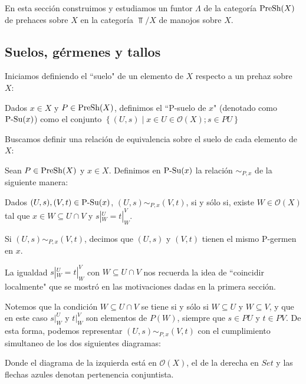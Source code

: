 En esta sección construimos y estudiamos un funtor $\Lambda$ de la categoría $\normalfont{\text{PreSh}}(X)$ de prehaces sobre $X$ en la categoría $\Top /X$ de manojos sobre $X$.

\subsection{Suelos, gérmenes y tallos}

Iniciamos definiendo el ``suelo" de un elemento de $X$ respecto a un prehaz sobre $X$:
\begin{Def}[$P$-suelo de $x$]
   Dados $x\in X$ y $P\in \normalfont{\text{PreSh}}(X)$, definimos el ``P-suelo de $x$" (denotado como $\normalfont{\text{P-Su}} (x)$) como el conjunto $\left\lbrace (U,s)\mid x\in U\in \mathcal{O}(X); s\in PU\right\rbrace$
\end{Def}
 Buscamos definir una relación de equivalencia sobre el suelo de cada elemento de $X$:
\begin{Def}
   Sean $P\in \normalfont{\text{PreSh}}(X)$ y $x\in X$. Definimos en $\normalfont{\text{P-Su}}(x)$ la relación $\sim_{P,x}$ de la siguiente manera:
   \begin{center}
      Dados $(U,s),(V,t)\in \normalfont{\text{P-Su}}(x)$, $(U,s)\sim_{P,x}(V,t)$, si y sólo si, existe $W\in\mathcal{O}(X)$ tal que $x\in W\subseteq U\cap V$ y $s|^{U}_{W}=t|^{V}_{W}$.
   \end{center}
   Si $(U,s)\sim_{P,x}(V,t)$, decimos que $(U,s)$ y $(V,t)$ tienen el mismo P-germen en $x$. 
\end{Def}
La igualdad $s|^{U}_{W}=t|^{V}_{W}$ con $W\subseteq U\cap V$ nos recuerda la idea de ``coincidir localmente" que se mostró en las motivaciones dadas en la primera sección.

Notemos que la condición $W\subseteq U\cap V$ se tiene si y sólo si $W\subseteq U$ y $W\subseteq V$, y que en este caso $s|^{U}_{W}$ y $t|^{V}_{W}$ son elementos de $P(W)$, siempre que $s\in PU$ y $t\in PV$. De esta forma, podemos representar $(U,s)\sim_{P,x}(V,t)$ con el cumplimiento simultaneo de los dos siguientes diagramas:

Donde el diagrama de la izquierda está en $\mathcal{O}(X)$, el de la derecha en $Set$ y las flechas azules denotan pertenencia conjuntista.

